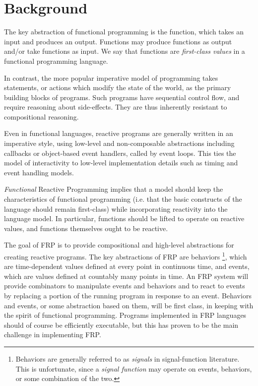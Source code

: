 \chapter{Background}
\label{chapter:Background}

The key abstraction of functional programming is the function, which takes an
input and produces an output. Functions may produce functions as output and/or
take functions as input. We say that functions are {\em first-class values} in a
functional programming language.

In contrast, the more popular imperative model of programming takes statements,
or actions which modify the state of the world, as the primary building blocks
of programs. Such programs have sequential control flow, and require reasoning
about side-effects. They are thus inherently resistant to compositional
reasoning.

Even in functional languages, reactive programs are generally written in an imperative style, using low-level and non-composable abstractions including callbacks
or object-based event handlers, called by event loops. This ties the model of interactivity to low-level implementation details such as timing and event handling models. 

{\em Functional} Reactive Programming implies that a model should keep the characteristics of functional programming (i.e. that the basic constructs of the language
should remain first-class) while incorporating reactivity into the language model. In particular, functions should be lifted to operate on reactive values,
and functions themselves ought to be reactive.

The goal of FRP is to provide compositional and high-level abstractions for
creating reactive programs. The key abstractions of FRP are behaviors
\footnote{Behaviors are generally referred to as {\em signals} in
signal-function literature. This is unfortunate, since a {\em signal function}
may operate on events, behaviors, or some combination of the two.}, which are
time-dependent values defined at every point in continuous time, and events,
which are values defined at countably many points in time. An FRP system will
provide combinators to manipulate events and behaviors and to react to events by
replacing a portion of the running program in response to an event. Behaviors
and events, or some abstraction based on them, will be first class, in keeping
with the spirit of functional programming. Programs implemented in FRP languages
should of course be efficiently executable, but this has proven to be the main
challenge in implementing FRP.

